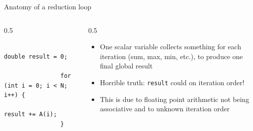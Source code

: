 \documentclass[
    aspectratio=169,
    \createHandout
]{beamer}
\begin{document}
\begin{frame}[fragile]{Anatomy of a reduction loop}
    \begin{columns}
        \begin{column}{0.5\linewidth}
            \begin{verbatim}
                double result = 0;

                for (int i = 0; i < N; i++) {
                    result += A(i);
                }
            \end{verbatim}
        \end{column}
        \begin{column}{0.5\linewidth}
            \begin{itemize}
                \item One scalar variable collects something for each iteration (sum, max, min, etc.), to produce one final global result
                \pause
                \item Horrible truth: \texttt{result} could  on iteration order!
                \item This is due to floating point arithmetic not being associative and to unknown iteration order
            \end{itemize}
        \end{column}
    \end{columns}
\end{frame}

\end{document}
